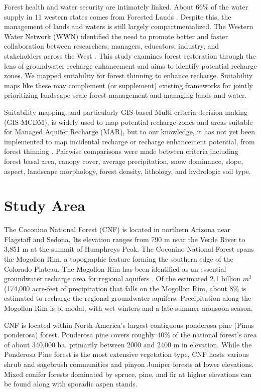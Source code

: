 \documentclass[
  number,
  preprint,
  3p,
  onecolumn]{elsarticle}
\begin{document}
Forest health and water security are intimately linked. About 66\% of
the water supply in 11 western states comes from Forested Lands
\citep{brown_source_2005}. Despite this, the management of lands and
waters is still largely compartmentalized. The Western Water Network
(WWN) identified the need to promote better and faster collaboration
between researchers, managers, educators, industry, and stakeholders
across the West \citep{hansen2024}. This study examines forest
restoration through the lens of groundwater recharge enhancement and
aims to identify potential recharge zones. We mapped suitability for
forest thinning to enhance recharge. Suitability maps like these may
complement (or supplement) existing frameworks for jointly prioritizing
landscape-scale forest management and managing lands and water.

Suitability mapping, and particularly GIS-based Multi-criteria decision
making (GIS-MCDM), is widely used to map potential recharge zones and
areas suitable for Managed Aquifer Recharge (MAR), but to our knowledge,
it has not yet been implemented to map incidental recharge or recharge
enhancement potential, from forest thinning
\citep{fathi2021, rajashekar2023, rahman2012}. Pairwise comparisons were
made between criteria including forest basal area, canopy cover, average
precipitation, snow dominance, slope, aspect, landscape morphology,
forest density, lithology, and hydrologic soil type.

\section{Study Area}\label{study-area}

The Coconino National Forest (CNF) is located in northern Arizona near
Flagstaff and Sedona. Its elevation ranges from 790 m near the Verde
River to 3,851 m at the summit of Humphreys Peak. The Coconino National
Forest spans the Mogollon Rim, a topographic feature forming the
southern edge of the Colorado Plateau. The Mogollon Rim has been
identified as an essential groundwater recharge area for regional
aquifers \citep{parker2005}. Of the estimated 2.1 billion \(m^3\)
(174,000 acre-feet of precipitation that falls on the Mogollon Rim,
about 8\% is estimated to recharge the regional groundwater
aquifers\citep{parker2005}. Precipitation along the Mogollon Rim is
bi-modal, with wet winters and a late-summer monsoon season.

CNF is located within North America's largest contiguous ponderosa pine
(Pinus ponderosa) forest. Ponderosa pine covers roughly 40\% of the
national forest's area of about 340,000 ha, primarily between 2000 and
2400 m in elevation. While the Ponderosa Pine forest is the most
extensive vegetation type, CNF hosts various shrub and sagebrush
communities and pinyon Juniper forests at lower elevations. Mixed
conifer forests dominated by spruce, pine, and fir at higher elevations
can be found along with sporadic aspen stands.
\end{document}
